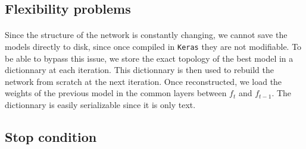 \documentclass[11 pt]{article}
\begin{document}
\subsection{Flexibility problems}
\paragraph{} Since the structure of the network is constantly changing, we cannot save the models directly to disk, since once compiled in \texttt{Keras} they are not modifiable. To be able to bypass this issue, we store the exact topology of the best model in a dictionnary at each iteration. This dictionnary is then used to rebuild the network from scratch at the next iteration. Once reconstructed, we load the weights of the previous model in the common layers between \(f_t\) and \(f_{t-1}\). The dictionnary is easily serializable since it is only text.

\subsection{Stop condition}
\end{document}
